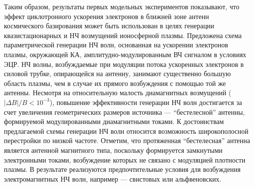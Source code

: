 \documentclass[autoref,10pt]{disser}
\begin{document}
Таким образом, результаты первых модельных экспериментов показывают, что эффект циклотронного ускорения электронов в ближней зоне антенн космического базирования может быть использован в целях генерации квазистационарных и НЧ возмущений ионосферной плазмы. Предложена схема параметрической генерации НЧ волн, основанная на ускорении электронов плазмы, окружающей КА, амплитудно-мо\-ду\-ли\-ро\-ван\-ным ВЧ сигналом в условиях ЭЦР. НЧ волны, возбуждаемые при модуляции потока ускоренных электронов в силовой трубке, опирающейся на антенну, занимают существенно большую область плазмы, чем в случае их прямого возбуждения с помощью той же антенны. Несмотря на относительную малость диамагнитных возмущений ($|\Delta{}B|/B < 10^{-3}$), повышение эффективности генерации НЧ волн достигается за счет увеличения геометрических размеров источника --- ``бестелесной'' антенны, формируемой модулированными диамагнитными токами. К достоинствам предлагаемой схемы генерации НЧ волн относится возможность широкополосной перестройки по низкой частоте. Отметим, что протяженная ``бестелесная'' антенна является антенной магнитного типа, поскольку формируется замкнутыми электронными токами, возбуждение которых не связано с модуляцией плотности плазмы. В результате реализуются предпочтительные условия для возбуждения электромагнитных НЧ волн, например --- свистовых или альфвеновских.
\clearpage
\end{document}
